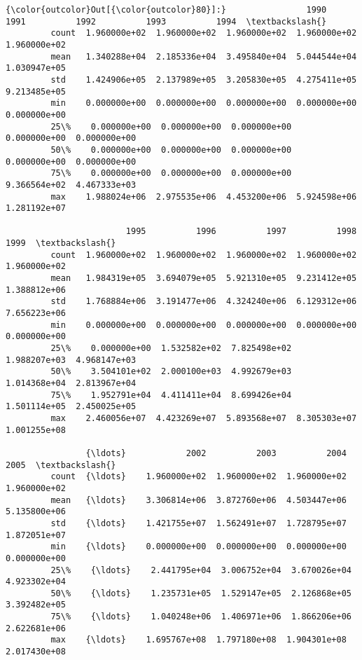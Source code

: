 \documentclass[11pt]{article}
\begin{document}
\begin{Verbatim}[commandchars=\\\{\}]
{\color{outcolor}Out[{\color{outcolor}80}]:}                1990          1991          1992          1993          1994  \textbackslash{}
         count  1.960000e+02  1.960000e+02  1.960000e+02  1.960000e+02  1.960000e+02   
         mean   1.340288e+04  2.185336e+04  3.495840e+04  5.044544e+04  1.030947e+05   
         std    1.424906e+05  2.137989e+05  3.205830e+05  4.275411e+05  9.213485e+05   
         min    0.000000e+00  0.000000e+00  0.000000e+00  0.000000e+00  0.000000e+00   
         25\%    0.000000e+00  0.000000e+00  0.000000e+00  0.000000e+00  0.000000e+00   
         50\%    0.000000e+00  0.000000e+00  0.000000e+00  0.000000e+00  0.000000e+00   
         75\%    0.000000e+00  0.000000e+00  0.000000e+00  9.366564e+02  4.467333e+03   
         max    1.988024e+06  2.975535e+06  4.453200e+06  5.924598e+06  1.281192e+07   
         
                        1995          1996          1997          1998          1999  \textbackslash{}
         count  1.960000e+02  1.960000e+02  1.960000e+02  1.960000e+02  1.960000e+02   
         mean   1.984319e+05  3.694079e+05  5.921310e+05  9.231412e+05  1.388812e+06   
         std    1.768884e+06  3.191477e+06  4.324240e+06  6.129312e+06  7.656223e+06   
         min    0.000000e+00  0.000000e+00  0.000000e+00  0.000000e+00  0.000000e+00   
         25\%    0.000000e+00  1.532582e+02  7.825498e+02  1.988207e+03  4.968147e+03   
         50\%    3.504101e+02  2.000100e+03  4.992679e+03  1.014368e+04  2.813967e+04   
         75\%    1.952791e+04  4.411411e+04  8.699426e+04  1.501114e+05  2.450025e+05   
         max    2.460056e+07  4.423269e+07  5.893568e+07  8.305303e+07  1.001255e+08   
         
                {\ldots}            2002          2003          2004          2005  \textbackslash{}
         count  {\ldots}    1.960000e+02  1.960000e+02  1.960000e+02  1.960000e+02   
         mean   {\ldots}    3.306814e+06  3.872760e+06  4.503447e+06  5.135800e+06   
         std    {\ldots}    1.421755e+07  1.562491e+07  1.728795e+07  1.872051e+07   
         min    {\ldots}    0.000000e+00  0.000000e+00  0.000000e+00  0.000000e+00   
         25\%    {\ldots}    2.441795e+04  3.006752e+04  3.670026e+04  4.923302e+04   
         50\%    {\ldots}    1.235731e+05  1.529147e+05  2.126868e+05  3.392482e+05   
         75\%    {\ldots}    1.040248e+06  1.406971e+06  1.866206e+06  2.622681e+06   
         max    {\ldots}    1.695767e+08  1.797180e+08  1.904301e+08  2.017430e+08   
         

\end{Verbatim}
\end{document}
